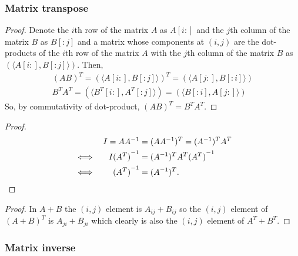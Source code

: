 \documentclass[MathsNotesBase.tex]{subfiles}
\begin{document}
{		\bigskip
		\subsubsection{Matrix transpose}
		\bigskip
		\begin{proof}
			Denote the $i$th row of the matrix $A$ as $A[i:]$ and the $j$th column of the matrix $B$ as $B[:j]$ and a matrix whose components at $(i,j)$ are the dot-products of the $i$th row of the matrix $A$ with the $j$th column of the matrix $B$ as $(\langle A[i:], B[:j] \rangle)$. Then,
			\begin{align*}
			(AB)^{T} = (\langle A[i:], B[:j] \rangle)^{T} = (\langle A[j:], B[:i] \rangle) \\
			B^{T}A^{T} = (\langle B^{T}[i:], A^{T}[:j] \rangle) = (\langle B[:i], A[j:] \rangle)
			\end{align*}
			So, by commutativity of dot-product, $(AB)^{T} = B^{T}A^{T}$.
		\end{proof}
		
		\medskip
		\begin{proof}
			\begin{align*}
			&& I = A{A}^{-1} &= (AA^{-1})^{T} = (A^{-1})^{T}A^{T} \\
			& \iff & I{(A^{T})}^{-1} &= (A^{-1})^{T}A^{T}{(A^{T})}^{-1} \\
			& \iff & {(A^{T})}^{-1} &= (A^{-1})^{T}. \qedhere
			\end{align*}
		\end{proof}		
		
		\medskip
		\begin{proof}
			In ${ A + B }$ the ${ (i,j) }$ element is ${ A_{ij} + B_{ij} }$ so the ${ (i,j) }$ element of ${ (A + B)^T }$ is ${ A_{ji} + B_{ji} }$ which clearly is also the ${ (i,j) }$ element of ${  A^T + B^T }$. \qedhere
		\end{proof}
		
		\bigskip
		\subsubsection{Matrix inverse}
		
}
\end{document}
